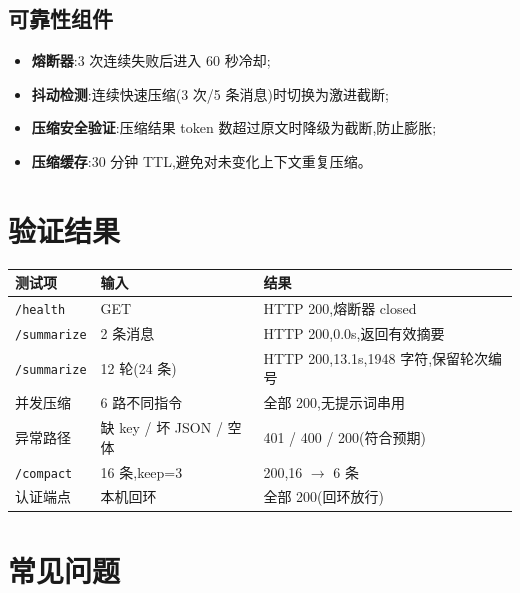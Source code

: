 \documentclass[11pt,a4paper]{article}
\begin{document}
\subsection{可靠性组件}

\begin{itemize}
  \item \textbf{熔断器}:3 次连续失败后进入 60 秒冷却;
  \item \textbf{抖动检测}:连续快速压缩(3 次/5 条消息)时切换为激进截断;
  \item \textbf{压缩安全验证}:压缩结果 token 数超过原文时降级为截断,防止膨胀;
  \item \textbf{压缩缓存}:30 分钟 TTL,避免对未变化上下文重复压缩。
\end{itemize}

\section{验证结果}

\begin{table}[h]
  \centering
  \begin{tabular}{@{}lp{4cm}p{7cm}@{}}
    \toprule
    测试项 & 输入 & 结果 \\
    \midrule
    \texttt{/health} & GET & HTTP 200,熔断器 closed \\
    \texttt{/summarize} & 2 条消息 & HTTP 200,0.0s,返回有效摘要 \\
    \texttt{/summarize} & 12 轮(24 条) & HTTP 200,13.1s,1948 字符,保留轮次编号 \\
    并发压缩 & 6 路不同指令 & 全部 200,无提示词串用 \\
    异常路径 & 缺 key / 坏 JSON / 空体 & 401 / 400 / 200(符合预期) \\
    \texttt{/compact} & 16 条,keep=3 & 200,16 $\rightarrow$ 6 条 \\
    认证端点 & 本机回环 & 全部 200(回环放行) \\
    \bottomrule
  \end{tabular}
\end{table}

\section{常见问题}
\end{document}
